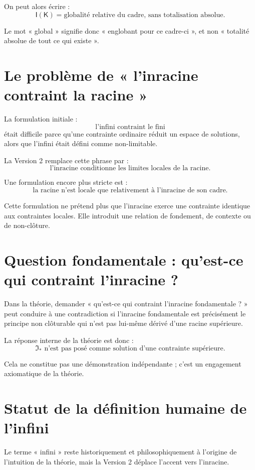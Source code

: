 \documentclass[11pt,a4paper]{article}
\newcommand{\Inrac}{\mathsf{I}}
\newcommand{\Cadre}{\mathsf{K}}
\begin{document}
On peut alors écrire :
\[
\boxed{
\Inrac(\Cadre)=\text{globalité relative du cadre, sans totalisation absolue}.
}
\]

Le mot « global » signifie donc « englobant pour ce cadre-ci », et non
« totalité absolue de tout ce qui existe ».

\section{Le problème de « l'inracine contraint la racine »}

La formulation initiale :
\[
\text{l'infini contraint le fini}
\]
était difficile parce qu'une contrainte ordinaire réduit un espace de solutions,
alors que l'infini était défini comme non-limitable.

La Version 2 remplace cette phrase par :
\[
\boxed{
\text{l'inracine conditionne les limites locales de la racine.}
}
\]

Une formulation encore plus stricte est :
\[
\boxed{
\text{la racine n'est locale que relativement à l'inracine de son cadre.}
}
\]

Cette formulation ne prétend plus que l'inracine exerce une contrainte
identique aux contraintes locales. Elle introduit une relation de fondement,
de contexte ou de non-clôture.

\section{Question fondamentale : qu'est-ce qui contraint l'inracine ?}

Dans la théorie, demander « qu'est-ce qui contraint l'inracine fondamentale ? »
peut conduire à une contradiction si l'inracine fondamentale est précisément
le principe non clôturable qui n'est pas lui-même dérivé d'une racine supérieure.

La réponse interne de la théorie est donc :
\[
\boxed{
\mathfrak I_\ast\text{ n'est pas posé comme solution d'une contrainte supérieure.}
}
\]

Cela ne constitue pas une démonstration indépendante ; c'est un engagement
axiomatique de la théorie.

\section{Statut de la définition humaine de l'infini}

Le terme « infini » reste historiquement et philosophiquement à l'origine de
l'intuition de la théorie, mais la Version 2 déplace l'accent vers
l'inracine.
\end{document}
